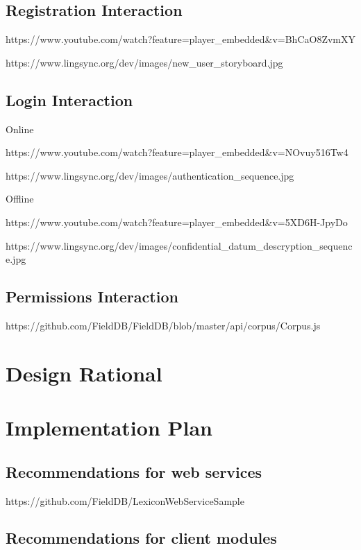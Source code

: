 \documentclass[12pt]{article}
\begin{document}
\subsection{Registration Interaction}

https://www.youtube.com/watch?feature=player\_embedded\&v=BhCaO8ZvmXY

https://www.lingsync.org/dev/images/new\_user\_storyboard.jpg

\subsection{Login Interaction}

Online 

https://www.youtube.com/watch?feature=player\_embedded\&v=NOvuy516Tw4

https://www.lingsync.org/dev/images/authentication\_sequence.jpg

Offline 

https://www.youtube.com/watch?feature=player\_embedded\&v=5XD6H-JpyDo

https://www.lingsync.org/dev/images/confidential\_datum\_descryption\_sequence.jpg



\subsection{Permissions Interaction}

https://github.com/FieldDB/FieldDB/blob/master/api/corpus/Corpus.js

\section{Design Rational}


\section{Implementation Plan}

\subsection{Recommendations for web services}

https://github.com/FieldDB/LexiconWebServiceSample

\subsection{Recommendations for client modules}
\end{document}
